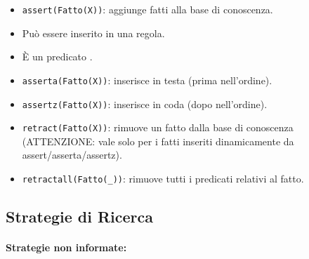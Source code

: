 \begin{itemize}
  \item \texttt{assert(Fatto(X))}: aggiunge fatti alla base di conoscenza. 
  \item Può essere inserito in una regola.
  \item È un predicato .
  \item \texttt{asserta(Fatto(X))}: inserisce in testa (prima nell'ordine). 
  \item \texttt{assertz(Fatto(X))}: inserisce in coda (dopo nell'ordine).
  \item \texttt{retract(Fatto(X))}: rimuove un fatto dalla base di conoscenza (ATTENZIONE: vale solo per i fatti inseriti dinamicamente da assert/asserta/assertz).
  \item \texttt{retractall(Fatto(\_))}: rimuove tutti i predicati relativi al fatto.
\end{itemize}

\subsection{Strategie di Ricerca}


\paragraph{Strategie non informate:}

